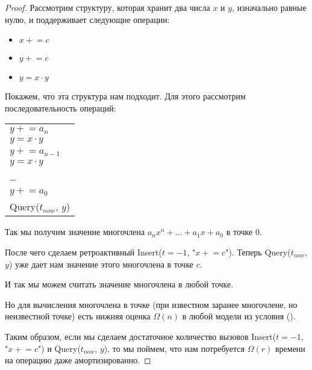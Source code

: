 \begin{proof}

Рассмотрим структуру, которая хранит два числа $x$ и $y$, изначально равные нулю, и поддерживает следующие операции:

\newcommand{\pluseq}{\mathrel{+}=}

\begin{itemize}

\item $x \pluseq c$
\item $y \pluseq c$
\item $y = x \cdot y$

\end{itemize}

Покажем, что эта структура нам подходит.
Для этого рассмотрим последовательность операций:

\begin{tabular}{ l }

$y \pluseq a_n$\\
$y = x \cdot y$\\
$y \pluseq a_{n - 1}$\\
$y = x \cdot y$\\
\dots\\
$y \pluseq a_0$\\
Query($t_{now}$, $y$)

\end{tabular}

\vspace{10pt}
Так мы получим значение многочлена $a_n x^n + \dots + a_1 x + a_0$ в точке 0.

После чего сделаем ретроактивный Insert($t = -1$, "$x \pluseq c$").
Теперь Query($t_{now}$, $y$) уже дает нам значение этого многочлена в точке $c$.

И так мы можем считать значение многочлена в любой точке.

Но для вычисления многочлена в точке (при известном заранее многочлене, но неизвестной точке) есть нижняя оценка $\Omega(n)$ в любой модели из условия (\cite{frandsen2001lower}).

Таким образом, если мы сделаем достаточное количество вызовов Insert($t = -1$, "$x \pluseq c$") и Query($t_{now}$, $y$), то мы поймем, что нам потребуется $\Omega(r)$ времени на операцию даже амортизированно.
\end{proof}

